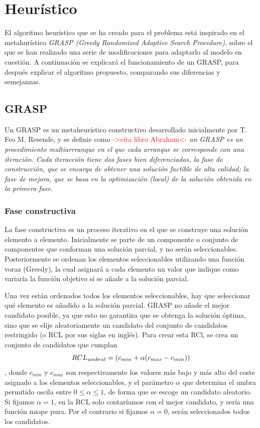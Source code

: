 \chapter{Heurístico}
\label{heurístico}
El algoritmo heurístico que se ha creado para el problema está inspirado en el metahurístico \textit{GRASP (Greedy Randomized Adaptive Search Procedure)}, sobre el que se han realizado una serie de modificaciones para adaptarlo al modelo en cuestión. A continuación se explicará el funcionamiento de un GRASP, para después explicar el algoritmo propuesto, comparando sus diferencias y semejanzas.

\section{GRASP}
Un GRASP es un metaheurístico constructivo desarrollado inicialmente por T. Feo   M. Resende, y se definie como \textcolor{red}{->cita libro Abraham<-} \textit{un GRASP es un procedimiento multiarrranque en el que cada arranque se corresponde con una iteración. Cada iteracción tiene dos fases bien diferenciadas, la fase de construcción, que se encarga de obtener una solución factible de alta calidad; la fase de mejora, que se basa en la optimización (local) de la solución obtenida en la primera fase.}

\subsection{Fase constructiva}
La fase constructiva es un proceso iterativo en el que se construye una solución elemento a elemento. Inicialmente se parte de un componente o conjunto de componentes que conforman una solución parcial, y no serán seleccionables. Posteriormente se ordenan los elementos seleccionables utilizando una función voraz (Greedy), la cual asignará a cada elemento un valor que indique como variaría la función objetivo si se añade a la solución parcial.

Una vez están ordenados todos los elementos seleccionables, hay que seleccionar qué elemento es añadido a la solución parcial. GRASP no añade el mejor candidato posible, ya que esto no garantiza que se obtenga la solución óptima, sino que se elije aleatoriamente un candidato del conjunto de candidatos restringido (o RCL por sus siglas en inglés). Para crear esta RCl, se crea un conjunto de candidatos que cumplan
\begin{equation}\\
{RCL}_{umbral} = (c_{min}+\alpha(c_{max} - c_{min} ))
\end{equation}
, donde $c_{min}$ y $c_{max}$ son respectivamente los valores más bajo y más alto del coste asignado a los elementos seleccionables, y el parámetro $\alpha$ que determina el umbra permitido oscila entre $0\leq \alpha \leq1$, de forma que se escoge un candidato aleatorio. Si fijamos $\alpha=1$, en la RCL solo contaríamos con el mejor candidato, y sería una función miope pura. Por el contrario si fijamos $\alpha=0$, serán seleccionados todos los candidatos.

